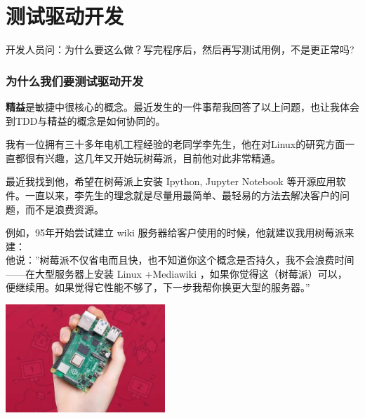 \chapter{测试驱动开发} %


开发人员问：为什么要这么做？写完程序后，然后再写测试用例，不是更正常吗?

\hypertarget{ux4e3aux4ec0ux4e48ux6211ux4eecux8981ux6d4bux8bd5ux9a71ux52a8ux5f00ux53d1}{%
\subsection{为什么我们要测试驱动开发}\label{ux4e3aux4ec0ux4e48ux6211ux4eecux8981ux6d4bux8bd5ux9a71ux52a8ux5f00ux53d1}}

\textbf{精益}是敏捷中很核心的概念。最近发生的一件事帮我回答了以上问题，也让我体会到TDD与精益的概念是如何协同的。

我有一位拥有三十多年电机工程经验的老同学李先生，他在对Linux的研究方面一直都很有兴趣，这几年又开始玩树莓派，目前他对此非常精通。

最近我找到他，希望在树莓派上安装 Ipython, Jupyter Notebook
等开源应用软件。一直以来，李先生的理念就是尽量用最简单、最轻易的方法去解决客户的问题，而不是浪费资源。

例如，95年开始尝试建立 wiki
服务器给客户使用的时候，他就建议我用树莓派来建：\\
他说：''树莓派不仅省电而且快，也不知道你这个概念是否持久，我不会浪费时间------在大型服务器上安装
Linux +Mediawiki ，如果你觉得这（树莓派）可以，
便继续用。如果觉得它性能不够了，下一步我帮你换更大型的服务器。''


\includegraphics[width=6cm]{树莓派2.jpg}

